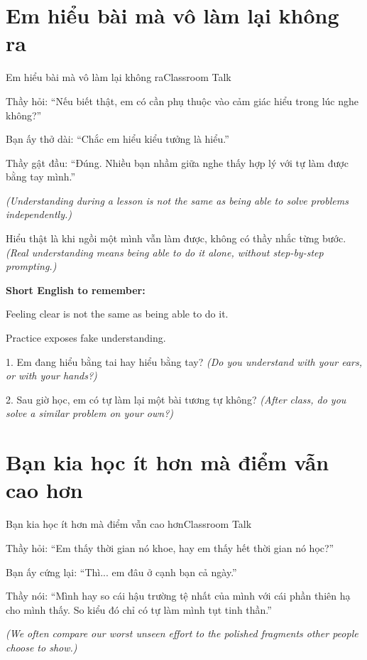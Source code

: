 \section{Em hiểu bài mà vô làm lại không ra}
\begin{truyen}{Em hiểu bài mà vô làm lại không ra}{Classroom Talk}

Thầy hỏi: ``Nếu biết thật, em có cần phụ thuộc vào cảm giác hiểu trong lúc nghe không?''

Bạn ấy thở dài: ``Chắc em hiểu kiểu tưởng là hiểu.''

Thầy gật đầu: ``Đúng. Nhiều bạn nhầm giữa nghe thấy hợp lý với tự làm được bằng tay mình.''

\textit{(Understanding during a lesson is not the same as being able to solve problems independently.)}
\end{truyen}

\begin{baihoc}
Hiểu thật là khi ngồi một mình vẫn làm được, không có thầy nhắc từng bước.
\textit{(Real understanding means being able to do it alone, without step-by-step prompting.)}
\end{baihoc}

\begin{ghinhoanh}
\textbf{Short English to remember:}

Feeling clear is not the same as being able to do it.

Practice exposes fake understanding.
\end{ghinhoanh}

\begin{tuhocnhanh}
1. Em đang hiểu bằng tai hay hiểu bằng tay? \textit{(Do you understand with your ears, or with your hands?)}

2. Sau giờ học, em có tự làm lại một bài tương tự không? \textit{(After class, do you solve a similar problem on your own?)}
\end{tuhocnhanh}
\ngancach

\section{Bạn kia học ít hơn mà điểm vẫn cao hơn}
\begin{truyen}{Bạn kia học ít hơn mà điểm vẫn cao hơn}{Classroom Talk}

Thầy hỏi: ``Em thấy thời gian nó khoe, hay em thấy hết thời gian nó học?''

Bạn ấy cứng lại: ``Thì... em đâu ở cạnh bạn cả ngày.''

Thầy nói: ``Mình hay so cái hậu trường tệ nhất của mình với cái phần thiên hạ cho mình thấy. So kiểu đó chỉ có tự làm mình tụt tinh thần.''

\textit{(We often compare our worst unseen effort to the polished fragments other people choose to show.)}
\end{truyen}

